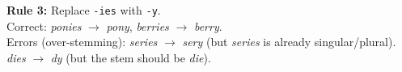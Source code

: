 \documentclass[11pt]{article}
\begin{document}
\begin{enumerate}
\begin{enumerate}
\textbf{Rule 3:} Replace \texttt{-ies} with \texttt{-y}.\\
Correct: \emph{ponies} $\to$ \emph{pony}, \emph{berries} $\to$ \emph{berry}.\\
Errors (over-stemming): \emph{series} $\to$ \emph{sery} (but \emph{series} is already singular/plural). \emph{dies} $\to$ \emph{dy} (but the stem should be \emph{die}).

\end{enumerate}

\end{enumerate}


\end{document}
